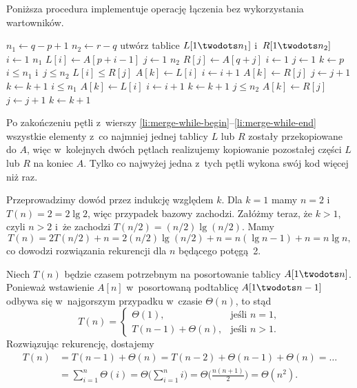 \exercise %
Poniższa procedura implementuje operację łączenia bez wykorzystania wartowników.
\begin{codebox}
\li	$n_1\gets q-p+1$
\li	$n_2\gets r-q$
\li	utwórz tablice $L[1\twodots n_1]$ i~$R[1\twodots n_2]$
\li	\For $i\gets1$ \To $n_1$
\li		\Do $L[i]\gets A[p+i-1]$
		\End
\li	\For $j\gets1$ \To $n_2$
\li		\Do $R[j]\gets A[q+j]$
		\End
\li	$i\gets1$
\li	$j\gets1$
\li	$k\gets p$
\li	\While $i\le n_1$ i~$j\le n_2$ \label{li:merge-while-begin}
\li		\Do
			\If $L[i]\le R[j]$
\li				\Then
					$A[k]\gets L[i]$
\li					$i\gets i+1$
\li				\Else
					$A[k]\gets R[j]$
\li					$j\gets j+1$
				\End
\li			$k\gets k+1$
		\End \label{li:merge-while-end}
\li	\While $i\le n_1$
\li		\Do
			$A[k]\gets L[i]$
\li			$i\gets i+1$
\li			$k\gets k+1$
		\End
\li	\While $j\le n_2$
\li		\Do
			$A[k]\gets R[j]$
\li			$j\gets j+1$
\li			$k\gets k+1$
		\End
\end{codebox}
Po zakończeniu pętli  z~wierszy \ref{li:merge-while-begin}\nobreakdash--\ref{li:merge-while-end} wszystkie elementy z~co najmniej jednej tablicy $L$ lub $R$ zostały przekopiowane do $A$, więc w~kolejnych dwóch pętlach  realizujemy kopiowanie pozostałej części $L$ lub $R$ na koniec $A$. Tylko co najwyżej jedna z~tych pętli wykona swój kod więcej niż raz.

\exercise %
Przeprowadzimy dowód przez indukcję względem $k$. Dla $k=1$ mamy $n=2$ i~$T(n)=2=2\lg2$, więc przypadek bazowy zachodzi. Załóżmy teraz, że $k>1$, czyli $n>2$ i~że zachodzi $T(n/2)=(n/2)\lg(n/2)$. Mamy
\[
	T(n) = 2T(n/2)+n = 2(n/2)\lg(n/2)+n = n(\lg n-1)+n = n\lg n,
\]
co dowodzi rozwiązania rekurencji dla $n$ będącego potęgą~2.

\exercise %
Niech $T(n)$ będzie czasem potrzebnym na posortowanie tablicy $A[1\twodots n]$. Ponieważ wstawienie $A[n]$ w~posortowaną podtablicę $A[1\twodots n-1]$ odbywa się w~najgorszym przypadku w~czasie $\Theta(n)$, to stąd
\[
	T(n) =
	\begin{cases}
		\Theta(1), & \text{jeśli $n=1$}, \\
		T(n-1)+\Theta(n), & \text{jeśli $n>1$}.
	\end{cases}
\]
Rozwiązując rekurencję, dostajemy
\begin{align*}
	T(n) &= T(n-1)+\Theta(n) = T(n-2)+\Theta(n-1)+\Theta(n) = \dots{} \\
	&= \sum_{i=1}^n\Theta(i) = \Theta\biggl(\sum_{i=1}^ni\biggr) = \Theta\biggl(\frac{n(n+1)}{2}\biggr) = \Theta(n^2).
\end{align*}

